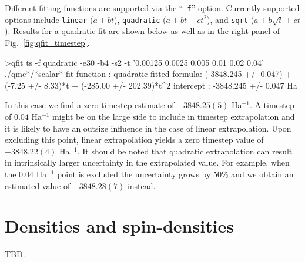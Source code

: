 Different fitting functions are supported via the ``\texttt{-f}'' option.
Currently supported options include \texttt{linear} ($a+bt$),
\texttt{quadratic} ($a+bt+ct^2$), and \texttt{sqrt} ($a+b\sqrt{t}+ct$).
Results for a quadratic fit are shown below as well as in the right
panel of Fig.~\ref{fig:qfit_timestep}.
\begin{shade}
>qfit ts -f quadratic -e30 -b4 -s2 -t '0.00125 0.0025 0.005 0.01 0.02 0.04' ./qmc*/*scalar*
fit function  : quadratic
fitted formula: (-3848.245 +/- 0.047) + (-7.25 +/- 8.33)*t + (-285.00 +/- 202.39)*t^2
intercept     : -3848.245 +/- 0.047  Ha
\end{shade}
In this case we find a zero timestep estimate of $-3848.25(5)$ Ha$^{-1}$.
A timestep of $0.04$ Ha$^{-1}$ might be on the large side to include in
timestep extrapolation and it is likely to have an outsize influence
in the case of linear extrapolation.  Upon excluding this point, linear
extrapolation yields a zero timestep value of $-3848.22(4)$ Ha$^{-1}$.
It should be noted that quadratic extrapolation can result in intrinsically
larger uncertainty in the extrapolated value.  For example, when the $0.04$
Ha$^{-1}$ point is excluded the uncertainty grows by 50\% and we obtain an
estimated value of $-3848.28(7)$ instead.



\section{Densities and spin-densities}
\label{sec:densities}
TBD.





